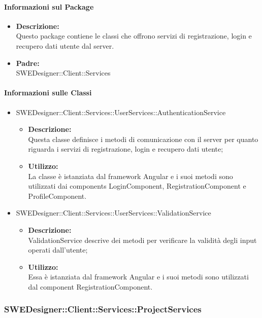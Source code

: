 		\paragraph{Informazioni sul Package}
		\begin{itemize}
			\item \textbf{Descrizione: }\\
			Questo package contiene le classi che offrono servizi di registrazione, login
			e recupero dati utente dal server.
			\item \textbf{Padre: }\\ SWEDesigner::Client::Services
		\end{itemize}

		\paragraph{Informazioni sulle Classi}
		\begin{itemize}
			\item SWEDesigner::Client::Services::UserServices::AuthenticationService
			\begin{itemize}
				\item \textbf{Descrizione: }\\
				Questa classe definisce i metodi di comunicazione con il server per quanto
				riguarda i servizi di registrazione, login e recupero dati utente;
				\item \textbf{Utilizzo: }\\
				La classe è istanziata dal framework Angular e i suoi metodi sono utilizzati
				dai components LoginComponent, RegistrationComponent e ProfileComponent.
			\end{itemize}
			\item SWEDesigner::Client::Services::UserServices::ValidationService
			\begin{itemize}
				\item \textbf{Descrizione: }\\
				ValidationService descrive dei metodi per verificare la validità degli input
				operati dall'utente;
				\item \textbf{Utilizzo: }\\
				Essa è istanziata dal framework Angular e i suoi metodi sono utilizzati
				dal component RegistrationComponent.
			\end{itemize}
		\end{itemize}


		\subsubsection{SWEDesigner::Client::Services::ProjectServices}
